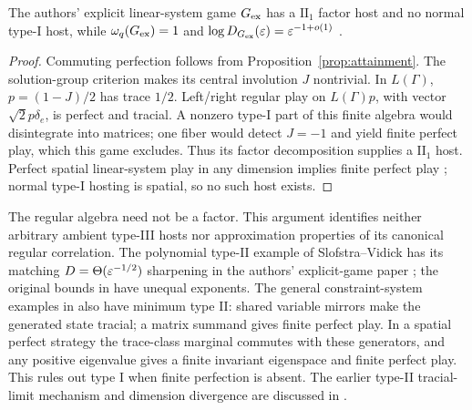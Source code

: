 \begin{proposition}\label{prop:ii-exp}
The authors' explicit linear-system game $G_{\rm ex}$ has a $\mathrm{II}_1$ factor host and no normal type-I host, while $\omega_q(G_{\rm ex})=1$ and $\log D_{G_{\rm ex}}(\varepsilon)=\varepsilon^{-1+o(1)}$ \cite{Explicit}.
\end{proposition}
\begin{proof}
Commuting perfection follows from Proposition~\ref{prop:attainment}. The solution-group criterion \cite[Theorems 4--5]{CLS} makes its central involution $J$ nontrivial. In $L(\Gamma)$, $p=(1-J)/2$ has trace $1/2$. Left/right regular play on $L(\Gamma)p$, with vector $\sqrt2p\delta_e$, is perfect and tracial. A nonzero type-I part of this finite algebra would disintegrate into matrices; one fiber would detect $J=-1$ and yield finite perfect play, which this game excludes. Thus its factor decomposition supplies a $\mathrm{II}_1$ host. Perfect spatial linear-system play in any dimension implies finite perfect play \cite[Theorem 3.2]{SloNonclosure}; normal type-I hosting is spatial, so no such host exists.
\end{proof}
The regular algebra need not be a factor. This argument identifies neither arbitrary ambient type-III hosts nor approximation properties of its canonical regular correlation. The polynomial type-II example of Slofstra--Vidick \cite{SV} has its matching $D=\Theta(\varepsilon^{-1/2})$ sharpening in the authors' explicit-game paper \cite{Explicit}; the original bounds in \cite{SV} have unequal exponents. The general constraint-system examples in \cite{Uncomputable} also have minimum type II: shared variable mirrors make the generated state tracial; a matrix summand gives finite perfect play. In a spatial perfect strategy the trace-class marginal commutes with these generators, and any positive eigenvalue gives a finite invariant eigenspace and finite perfect play. This rules out type I when finite perfection is absent. The earlier type-II tracial-limit mechanism and dimension divergence are discussed in \cite{Precision}.


